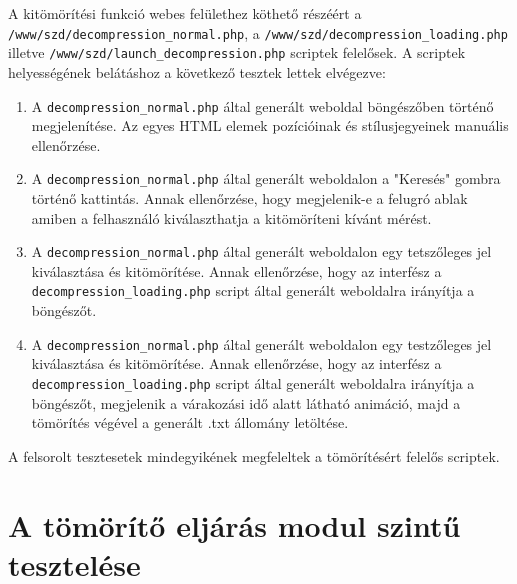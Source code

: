 \documentclass[oneside,titlepage,12pt,a4paper]{report}
\begin{document}
A kitömörítési funkció webes felülethez köthető részéért a \texttt{/www/szd/decompression\_normal.php}, a \texttt{/www/szd/decompression\_loading.php} illetve \texttt{/www/szd/launch\_decompression.php} scriptek felelősek. A scriptek helyességének belátáshoz a következő tesztek lettek elvégezve:

\begin{enumerate}
\item A \texttt{decompression\_normal.php} által generált weboldal böngészőben történő megjelenítése. Az egyes HTML elemek pozícióinak és stílusjegyeinek manuális ellenőrzése.
\item A \texttt{decompression\_normal.php} által generált weboldalon a "Keresés" gombra történő kattintás. Annak ellenőrzése, hogy megjelenik-e a felugró ablak amiben a felhasználó kiválaszthatja a kitömöríteni kívánt mérést.
\item A \texttt{decompression\_normal.php} által generált weboldalon egy tetszőleges jel kiválasztása és kitömörítése. Annak ellenőrzése, hogy az interfész a \texttt{decompression\_loading.php} script által generált weboldalra irányítja a böngészőt.

\item A \texttt{decompression\_normal.php} által generált weboldalon egy testzőleges jel kiválasztása és kitömörítése. Annak ellenőrzése, hogy az interfész a \texttt{decompression\_loading.php} script által generált weboldalra irányítja a böngészőt, megjelenik a várakozási idő alatt látható animáció, majd a tömörítés végével a generált .txt állomány letöltése. 

\end{enumerate}

A felsorolt tesztesetek mindegyikének megfeleltek a tömörítésért felelős scriptek.


\section{A tömörítő eljárás modul szintű tesztelése}
\end{document}
